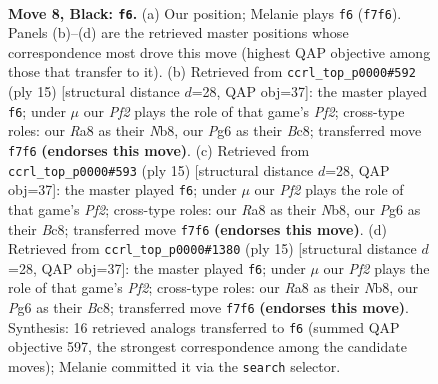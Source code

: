 \documentclass[11pt]{article}
\begin{document}
\begin{figure}[p]\centering
\begin{subfigure}{0.46\textwidth}\centering
\resizebox{\linewidth}{!}{%
\newchessgame
\chessboard[
  setfen={rnbq1rk1/ppp2pbp/3p2p1/4p3/2PPP1n1/2N2N1P/PP2BPP1/1RBQK2R b K - 0 8},
  showmover=false,
  pgfstyle=straightmove, color=movearrow, markmove={f7-f6}
]}
\caption{}
\end{subfigure}\hfill
\begin{subfigure}{0.46\textwidth}\centering
\resizebox{\linewidth}{!}{%
\newchessgame
\chessboard[
  setfen={rnbq1rk1/ppp2pbp/3p2p1/4p1B1/2PPP1n1/2N2N2/PP2BPPP/R2QK2R b KQ - 3 8},
  showmover=false,
  pgfstyle=straightmove, color=movearrow, markmove={f7-f6}
]}
\caption{}
\end{subfigure}
\\[4pt]
\begin{subfigure}{0.46\textwidth}\centering
\resizebox{\linewidth}{!}{%
\newchessgame
\chessboard[
  setfen={rnbq1rk1/ppp2pbp/3p2p1/4p1B1/2PPP1n1/2N2N2/PP2BPPP/R2QK2R b KQ - 3 8},
  showmover=false,
  pgfstyle=straightmove, color=movearrow, markmove={f7-f6}
]}
\caption{}
\end{subfigure}\hfill
\begin{subfigure}{0.46\textwidth}\centering
\resizebox{\linewidth}{!}{%
\newchessgame
\chessboard[
  setfen={rnbq1rk1/ppp2pbp/3p2p1/4p1B1/2PPP1n1/2N2N2/PP2BPPP/R2QK2R b KQ - 3 8},
  showmover=false,
  pgfstyle=straightmove, color=movearrow, markmove={f7-f6}
]}
\caption{}
\end{subfigure}
\caption{\textbf{Move 8, Black: \texttt{f6}.} (a) Our position; Melanie plays \texttt{f6} (\texttt{f7f6}). Panels (b)--(d) are the retrieved master positions whose correspondence most drove this move (highest QAP objective among those that transfer to it). (b) Retrieved from \texttt{ccrl\_top\_p0000\#592} (ply 15) [structural distance $d$=28, QAP obj=37]: the master played \texttt{f6}; under $\mu$ our \emph{Pf2} plays the role of that game's \emph{Pf2}; cross-type roles: our \emph{R}a8 as their \emph{N}b8, our \emph{P}g6 as their \emph{B}c8; transferred move \texttt{f7f6} \textbf{(endorses this move)}. (c) Retrieved from \texttt{ccrl\_top\_p0000\#593} (ply 15) [structural distance $d$=28, QAP obj=37]: the master played \texttt{f6}; under $\mu$ our \emph{Pf2} plays the role of that game's \emph{Pf2}; cross-type roles: our \emph{R}a8 as their \emph{N}b8, our \emph{P}g6 as their \emph{B}c8; transferred move \texttt{f7f6} \textbf{(endorses this move)}. (d) Retrieved from \texttt{ccrl\_top\_p0000\#1380} (ply 15) [structural distance $d$=28, QAP obj=37]: the master played \texttt{f6}; under $\mu$ our \emph{Pf2} plays the role of that game's \emph{Pf2}; cross-type roles: our \emph{R}a8 as their \emph{N}b8, our \emph{P}g6 as their \emph{B}c8; transferred move \texttt{f7f6} \textbf{(endorses this move)}. Synthesis: 16 retrieved analogs transferred to \texttt{f6} (summed QAP objective 597, the strongest correspondence among the candidate moves); Melanie committed it via the \texttt{search} selector.}
\label{fig:thought-m15}
\end{figure}
\end{document}
